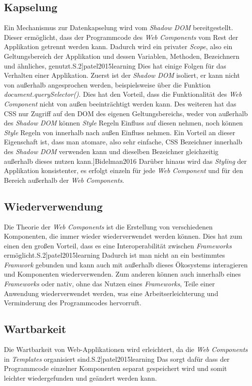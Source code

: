 \documentclass[12pt, paper=a4, bibtotoc, toc=listof, headsepline=true]{scrreprt}
\renewcommand{\smfootcite}[2][2]{\relax}
\begin{document}
			\subsection{Kapselung}
			Ein Mechanismus zur Datenkapselung wird vom \emph{Shadow DOM} bereitgestellt.
			Dieser ermöglicht, dass der Programmcode des \emph{Web Components} vom Rest der Applikation getrennt werden kann. Dadurch wird ein privater \emph{Scope}, also ein Geltungsbereich der Applikation und dessen Variablen, Methoden, Bezeichnern und ähnliches, genutzt.\smfootcite[ vgl.][S.2]{patel2015learning} Dies hat einige Folgen für das Verhalten einer Applikation. Zuerst ist der \emph{Shadow \ac{DOM}} isoliert, er kann nicht von außerhalb angesprochen werden, beispielsweise über die Funktion \emph{document.querySelector()}. Dies hat den Vorteil, dass die Funktionalität des \emph{Web Component} nicht von außen beeinträchtigt werden kann. Des weiteren hat das \ac{CSS} nur Zugriff auf den \ac{DOM} des eigenen Geltungsbereichs, weder von außerhalb des \emph{Shadow \ac{DOM}} können \emph{Style} Regeln Einfluss auf diesen nehmen, noch können \emph{Style} Regeln von innerhalb nach außen Einfluss nehmen. Ein Vorteil an dieser Eigenschaft ist, dass man atomare, also sehr einfache, \ac{CSS} Bezeichner innerhalb des \emph{Shadow \ac{DOM}} verwenden kann und dieselben Bezeichner gleichzeitig außerhalb dieses nutzen kann.\smfootcite[ vgl.][]{Bidelman2016} Darüber hinaus wird das \emph{Styling} der Applikation konsistenter, es erfolgt einzeln für jede \emph{Web Component} und für den Bereich außerhalb der \emph{Web Components}.
			\subsection{Wiederverwendung}
			Die Theorie der \emph{Web Components} ist die Erstellung von verschiedenen Komponenten, die immer wieder wiederverwendet werden können. Dies hat zum einen den großen Vorteil, dass es eine Interoperabilität zwischen \emph{Frameworks} ermöglicht.\smfootcite[ vgl.][S.2]{patel2015learning} Dadurch ist man nicht an ein bestimmtes \emph{Framwork} gebunden und kann auch mit außerhalb dieses Ökosystems interagieren und Komponenten wiederverwenden. Zum anderen können auch innerhalb eines \emph{Frameworks} oder nativ, ohne das Nutzen eines \emph{Frameworks}, Teile einer Anwendung wiederverwendet werden, was eine Arbeitserleichterung und Verminderung des Programmcodes hervorruft. 
			\subsection{Wartbarkeit}
			Die Wartbarkeit von Web-Applikationen wird erleichtert, da die \emph{Web Components} in \emph{Templates} organisiert sind.\smfootcite[ vgl.][S.2]{patel2015learning} Das sorgt dafür dass der Programmcode einzelner Komponenten separat gespeichert wird und somit leichter wiedergefunden und geändert werden kann.
\end{document}

